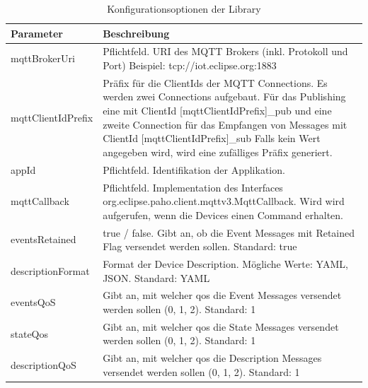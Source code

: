 \begin{table}[H]
\begin{tabularx}{\textwidth}{|l|X|}

 \hline \rowcolor{lightgray}
 {\bf Parameter } & {\bf Beschreibung }  \\  \hline
 
 mqttBrokerUri & Pflichtfeld. URI des MQTT Brokers (inkl. Protokoll und Port) \newline Beispiel: tcp://iot.eclipse.org:1883 \\ \hline
 
 mqttClientIdPrefix & Präfix für die ClientIds der MQTT Connections. Es werden zwei Connections aufgebaut. Für das Publishing eine mit ClientId {[mqttClientIdPrefix]}\_pub und eine zweite Connection für das Empfangen von Messages mit ClientId {[mqttClientIdPrefix]}\_sub \newline Falls kein Wert angegeben wird, wird eine zufälliges Präfix generiert. \\ \hline
 
 appId & Pflichtfeld. Identifikation der Applikation. \\ \hline
 
 mqttCallback & Pflichtfeld. Implementation des Interfaces org.eclipse.paho.client.mqttv3.MqttCallback. Wird wird aufgerufen, wenn die Devices einen Command erhalten. \\ \hline
 eventsRetained &  true / false. Gibt an, ob die Event Messages mit Retained Flag versendet werden sollen. \newline Standard: true \\ \hline
 
 descriptionFormat & Format der Device Description. Mögliche Werte: YAML, JSON. \newline Standard: YAML \\ \hline
 
 eventsQoS & Gibt an, mit welcher \gls{qos} die Event Messages versendet werden sollen (0, 1, 2). \newline Standard: 1 \\ \hline
 
 stateQos & Gibt an, mit welcher \gls{qos} die State Messages versendet werden sollen (0, 1, 2). \newline Standard: 1 \\ \hline
 
 descriptionQoS & Gibt an, mit welcher \gls{qos} die Description Messages versendet werden sollen (0, 1, 2). \newline Standard: 1 \\ \hline
 
\end{tabularx}
\caption{Konfigurationsoptionen der Library}
\end{table}



